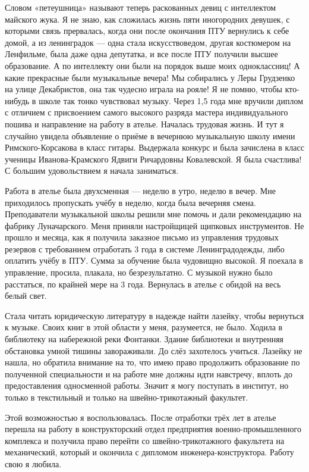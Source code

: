 Словом «петеушница» называют теперь раскованных девиц с интеллектом майского жука.
Я не знаю, как сложилась жизнь пяти иногородних девушек, с которыми связь прервалась, когда они после окончания ПТУ вернулись к себе домой, а из ленинградок --- одна стала искусствоведом, другая костюмером на Ленфильме, была даже одна депутатка, и все после ПТУ получили высшее образование.
А по интеллекту они были на порядок выше моих одноклассниц! 
А какие прекрасные были музыкальные вечера! 
Мы собирались у Леры Грудзенко на улице Декабристов, она так чудесно играла на рояле! 
Я не помню, чтобы кто-нибудь в школе так тонко чувствовал музыку.
Через 1,5 года мне вручили диплом с отличием с присвоением самого высокого разряда мастера индивидуального пошива и направление на работу в ателье.
Началась трудовая жизнь.
И тут я случайно увидела объявление о приёме в вечернюю музыкальную школу имени Римского-Корсакова в класс гитары.
Выдержала конкурс и была зачислена в класс ученицы Иванова-Крамского Ядвиги Ричардовны Ковалевской.
Я была счастлива! 
С большим удовольствием я начала заниматься.

Работа в ателье была двухсменная --- неделю в утро, неделю в вечер.
Мне приходилось пропускать учёбу в неделю, когда была вечерняя смена.
Преподаватели музыкальной школы решили мне помочь и дали рекомендацию на фабрику Луначарского.
Меня приняли настройщицей щипковых инструментов.
Не прошло и месяца, как я получила заказное письмо из управления трудовых резервов с требованием отработать 3 года в системе Ленинградодежды, либо оплатить учёбу в ПТУ.
Сумма за обучение была чудовищно высокой.
Я поехала в управление, просила, плакала, но безрезультатно.
С музыкой нужно было расстаться, по крайней мере на 3 года.
Вернулась в ателье с обидой на весь белый свет.

Стала читать юридическую литературу в надежде найти лазейку, чтобы вернуться к музыке.
Своих книг в этой области у меня, разумеется, не было.
Ходила в библиотеку на набережной реки Фонтанки.
Здание библиотеки и внутренняя обстановка умной тишины завораживали.
До слёз захотелось учиться.
Лазейку не нашла, но обратила внимание на то, что имею право продолжить образование по полученной специальности и на работе мне должны идти навстречу, вплоть до предоставления односменной работы.
Значит я могу поступать в институт, но только в текстильный и только на швейно-трикотажный факультет.

Этой возможностью я воспользовалась.
После отработки трёх лет в ателье перешла на работу в конструкторский отдел предприятия военно-промышленного комплекса и получила право перейти со швейно-трикотажного факультета на механический, который и окончила с дипломом инженера-конструктора.
Работу свою я любила.

